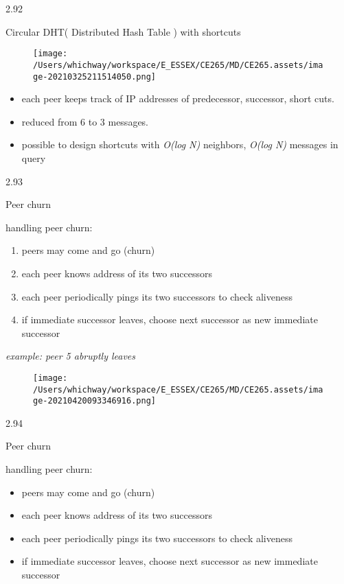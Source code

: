 \documentclass[
]{article}
\begin{document}
2.92

Circular DHT( Distributed Hash Table ) with shortcuts

\begin{figure}
\centering
\texttt{[image: /Users/whichway/workspace/E\_ESSEX/CE265/MD/CE265.assets/image-20210325211514050.png]}
\caption{}
\end{figure}

\begin{itemize}
\item
  each peer keeps track of IP addresses of predecessor, successor, short
  cuts.
\item
  reduced from 6 to 3 messages.
\item
  possible to design shortcuts with \emph{O(log N)} neighbors,
  \emph{O(log N)} messages in query
\end{itemize}

2.93

Peer churn

handling peer churn:

\begin{enumerate}
\def\labelenumi{\arabic{enumi}.}
\item
  peers may come and go (churn)
\item
  each peer knows address of its two successors
\item
  each peer periodically pings its two successors to check aliveness
\item
  if immediate successor leaves, choose next successor as new immediate
  successor
\end{enumerate}

\emph{example: peer 5 abruptly leaves}

\begin{figure}
\centering
\texttt{[image: /Users/whichway/workspace/E\_ESSEX/CE265/MD/CE265.assets/image-20210420093346916.png]}
\caption{}
\end{figure}

2.94

Peer churn

handling peer churn:

\begin{itemize}
\item
  peers may come and go (churn)
\item
  each peer knows address of its two successors
\item
  each peer periodically pings its two successors to check aliveness
\item
  if immediate successor leaves, choose next successor as new immediate
  successor
\end{itemize}
\end{document}

